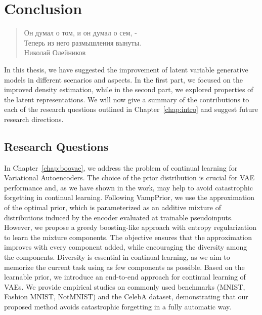 \chapter{Conclusion}


\begin{quote}
\normalsize\itshape
\begin{flushright}
\foreignlanguage{russian}{Он думал о том, и он думал о сем, -}\\
\foreignlanguage{russian}{Теперь из него размышления вынуты.}  \\
\foreignlanguage{russian}{Николай Олейников} \\ \vskip 10pt
\end{flushright}
\end{quote}

In this thesis, we have suggested the improvement of latent variable generative models in different scenarios and aspects. In the first part, we focused on the improved density estimation, while in the second part, we explored properties of the latent representations. 
We will now give a summary of the contributions to each of the research questions outlined in Chapter~\ref{chap:intro} and suggest future research directions.

\section{Research Questions}
In Chapter~\ref{chap:boovae}, we address the problem of continual learning for Variational Autoencoders. 
The choice of the prior distribution is crucial for VAE performance and, as we have shown in the work, may help to avoid catastrophic forgetting in continual learning. 
Following VampPrior, we use the approximation of the optimal prior, which is parameterized as an additive mixture of distributions induced by the encoder evaluated at trainable pseudoinputs. 
However, we propose a greedy boosting-like approach with entropy regularization to learn the mixture components. 
The objective ensures that the approximation improves with every component added, while encouraging the diversity among the components. 
Diversity is essential in continual learning, as we aim to memorize the current task using as few components as possible. 
Based on the learnable prior, we introduce an end-to-end approach for continual learning of VAEs. 
We provide empirical studies on commonly used benchmarks (MNIST, Fashion MNIST, NotMNIST) and the CelebA dataset, demonstrating that our proposed method avoids catastrophic forgetting in a fully automatic way.


